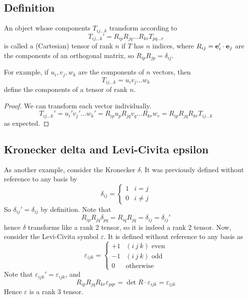 \subsection{Definition}
\begin{definition}
	An object whose components \(T_{ij\dots k}\) transform according to
	\[
		T_{ij\dots k}' = R_{ip}R_{jq}\dots R_{kr} T_{pq\dots r}
	\]
	is called a (Cartesian) tensor of rank \(n\) if \(T\) has \(n\) indices, where \(R_{ij} = \vb e_i' \cdot \vb e_j\) are the components of an orthogonal matrix, so \(R_{ip} R_{jp} = \delta_{ij}\).
\end{definition}
\noindent For example, if \(u_i, v_j, w_k\) are the components of \(n\) vectors, then
\[
	T_{ij\dots k} = u_i v_j \dots w_k
\]
define the components of a tensor of rank \(n\).
\begin{proof}
	We can transform each vector individually.
	\[
		T_{ij\dots k}' = u_i' v_j' \dots w_k' = R_{ip}u_p R_{jq}v_q \dots R_{kr}w_r = R_{ip}R_{jq}R_{kr} T_{ij\dots k}
	\]
	as expected.
\end{proof}

\subsection{Kronecker delta and Levi-Civita epsilon}
As another example, consider the Kronecker \(\delta\).
It was previously defined without reference to any basis by
\[
	\delta_{ij} = \begin{cases}
		1 & i = j    \\
		0 & i \neq j
	\end{cases}
\]
So \(\delta_{ij}' = \delta_{ij}\) by definition.
Note that
\[
	R_{ip}R_{jq} \delta_{pq} = R_{iq}R_{jq} = \delta_{ij} = \delta_{ij}'
\]
hence \(\delta\) transforms like a rank 2 tensor, so it is indeed a rank 2 tensor.
Now, consider the Levi-Civita symbol \(\varepsilon\).
It is defined without reference to any basis as
\[
	\varepsilon_{ijk} = \begin{cases}
		+1 & (i\ j\ k) \text{ even} \\
		-1 & (i\ j\ k) \text{ odd}  \\
		0  & \text{otherwise}
	\end{cases}
\]
Note that \(\varepsilon_{ijk}' = \varepsilon_{ijk}\), and
\[
	R_{ip}R_{jq}R_{kr} \varepsilon_{pqr} = \det R \cdot \varepsilon_{ijk} = \varepsilon_{ijk}
\]
Hence \(\varepsilon\) is a rank 3 tensor.

